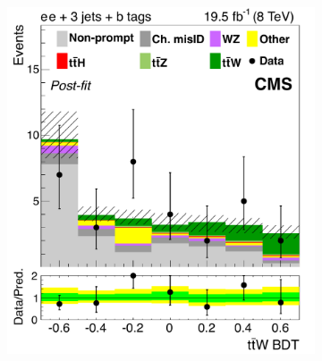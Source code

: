 \begin{table}
  
  \label{tab:8-results-ttW}
\end{table}
\begin{table}
  
  \label{tab:8-results-ttZ}
\end{table}
\begin{figure}[tb]
  \begin{subfigure}{0.33\textwidth}
    \includegraphics[width=\textwidth]{figures/eight-TeV/mva/ele_ele_eq3j_bloose_FinalBDT}
    \caption{}
    \label{sfig:8-ttW-tl}
  \end{subfigure}%
  \begin{subfigure}{0.33\textwidth}

\end{subfigure}
\end{figure}

